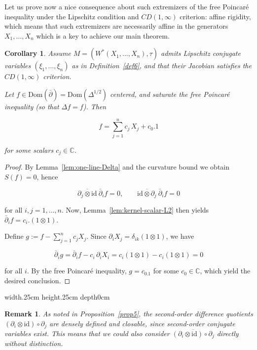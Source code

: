 \documentclass[10pt,a4paper,reqno]{amsart}
\newtheorem{corollary}[theorem]{Corollary}
\newtheorem{remark}[theorem]{Remark}
\def\qed{ \hfill \vrule width.25cm height.25cm depth0cm\smallskip}
\newcommand{\C}{\mathbb{C}}
\newcommand{\Dom}{\mathrm{Dom}}
\begin{document}
\begin{flushleft}
    Let us prove now a nice consequence about such extremizers of the free Poincar\'e inequality under the Lipschitz condition and $CD(1,\infty)$ criterion: affine rigidity, which means that such extremizers are necessarily affine in the generators $X_1,\ldots,X_n$ which is a key to achieve our main theorem. 
\end{flushleft}

\begin{corollary}\label{affine}
Assume $M=(W^*(X_1,\ldots,X_n),\tau)$ admits \emph{Lipschitz conjugate variables} $(\xi_1,\dots,\xi_n)$ as in Definition~\ref{def6}, 
and that their Jacobian satisfies the $CD(1,\infty)$ criterion.

Let $f\in \Dom(\bar\partial)=\Dom(\Delta^{1/2})$ centered, and saturate the free Poincaré inequality (so that $\Delta f=f$). Then


\[
f=\sum_{j=1}^n c_j\,X_j+c_0. 1
\]


for some scalars $c_j\in\C$.
\end{corollary}

\begin{proof}
By Lemma~\ref{lem:one-line-Delta} and the curvature bound we obtain $S(f)=0$, hence


\[
\overline{\partial_j\otimes \mathrm{id}}\:\bar\partial_i f=0, \qquad \overline{\mathrm{id}\otimes \partial_j}\:\bar \partial_i f=0
\]


for all $i,j=1,\ldots,n$. 
\newline
Now, Lemma~\ref{lem:kernel-scalar-L2} then yields $\bar\partial_i f=c_i.(1\otimes 1)$. 

Define $g:=f-\sum_{j=1}^n c_j X_j$. Since $\partial_i X_j=\delta_{ik}(1\otimes 1)$, we have


\[
\bar\partial_i g=\bar\partial_i f-c_i\,\partial_i X_i=c_i(1\otimes 1)-c_i(1\otimes 1)=0
\]


for all $i$. By the free Poincar\'e inequality, $g=c_0.1$ for some $c_0\in\C$, which yield the desired conclusion.
\end{proof}
\qed
\begin{remark}
As noted in Proposition~\ref{prop5}, the second-order difference quotients $(\partial_i\otimes \mathrm{id})\circ \partial_j$ are densely defined and closable, since second-order conjugate variables exist. This means that we could also consider $\overline{(\partial_i\otimes \mathrm{id})\circ \partial_j}$ directly without distinction.
\end{remark}
\end{document}
